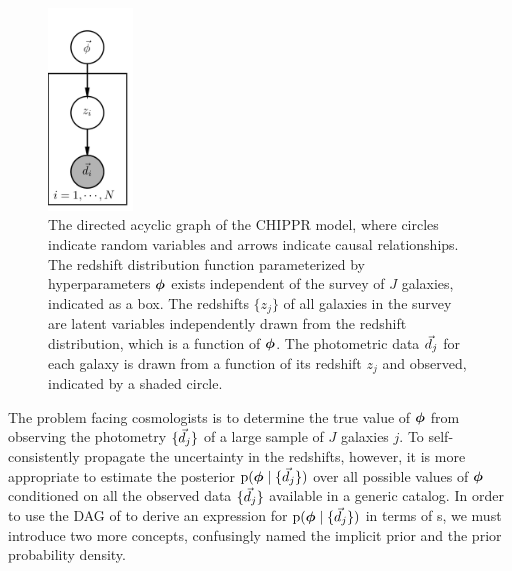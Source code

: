 \begin{figure}
	\begin{center}
		\includegraphics[width=0.2\textwidth]{figures/chippr/pgm.png}
		\caption{The directed acyclic graph of the CHIPPR model, where circles indicate random variables and arrows indicate causal relationships.
			The redshift distribution function parameterized by hyperparameters ${\boldsymbol{\phi}}$ exists independent of the survey of $J$ galaxies, indicated as a box.  
			The redshifts $\{z_{j}\}$ of all galaxies in the survey are latent variables independently drawn from the redshift distribution, which is a function of ${\boldsymbol{\phi}}$. 
			The photometric data $\vec{d}_{j}$ for each galaxy is drawn from a function of its redshift $z_{j}$ and observed, indicated by a shaded circle.}
	\end{center}
\end{figure}

The problem facing cosmologists is to determine the true value of ${\boldsymbol{\phi}}$ from observing the photometry $\{\vec{d}_{j}\}$ of a large sample of $J$ galaxies $j$.
To self-consistently propagate the uncertainty in the redshifts, however, it is more appropriate to estimate the posterior $\mathrm{p}({\boldsymbol{\phi}} \mid \{\vec{d}_{j}\})$ over all possible values of ${\boldsymbol{\phi}}$ conditioned on all the observed data $\{\vec{d}_{j}\}$ available in a generic catalog.
In order to use the DAG of  to derive an expression for $\mathrm{p}({\boldsymbol{\phi}} \mid \{\vec{d}_{j}\})$ in terms of \pzpdf s, we must introduce two more concepts, confusingly named the implicit prior and the prior probability density.

